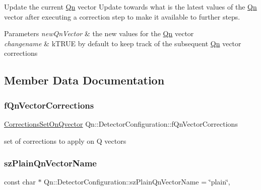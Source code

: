 Update the current \mbox{\hyperlink{namespaceQn}{Qn}} vector Update towards what is the latest values of the \mbox{\hyperlink{namespaceQn}{Qn}} vector after executing a correction step to make it available to further steps. 
\begin{DoxyParams}{Parameters}
{\em new\+Qn\+Vector} & the new values for the \mbox{\hyperlink{namespaceQn}{Qn}} vector \\
\hline
{\em changename} & k\+T\+R\+UE by default to keep track of the subsequent \mbox{\hyperlink{namespaceQn}{Qn}} vector corrections \\
\hline
\end{DoxyParams}


\subsection{Member Data Documentation}
\mbox{\label{classQn_1_1DetectorConfiguration_aa25d2e08bd0e206475972657447ecf33}} 
\subsubsection{\texorpdfstring{f\+Qn\+Vector\+Corrections}{fQnVectorCorrections}}
{\footnotesize\ttfamily \mbox{\hyperlink{classQn_1_1CorrectionsSetOnQvector}{Corrections\+Set\+On\+Qvector}} Qn\+::\+Detector\+Configuration\+::f\+Qn\+Vector\+Corrections\hspace{0.3cm}{\ttfamily [protected]}}

set of corrections to apply on Q vectors \mbox{\label{classQn_1_1DetectorConfiguration_a72caf89bf39a06cb23346bec00948c08}} 
\subsubsection{\texorpdfstring{sz\+Plain\+Qn\+Vector\+Name}{szPlainQnVectorName}}
{\footnotesize\ttfamily const char $\ast$ Qn\+::\+Detector\+Configuration\+::sz\+Plain\+Qn\+Vector\+Name = \char`\"{}plain\char`\"{}\hspace{0.3cm}{\ttfamily [static]}, {\ttfamily [protected]}}


